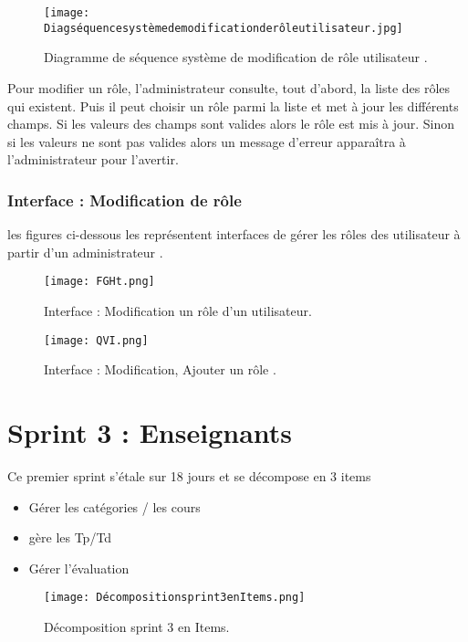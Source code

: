 \begin{figure}[ht]
	\centering
	\texttt{[image: Diagséquencesystèmedemodificationderôleutilisateur.jpg]}
	\caption{Diagramme de séquence système de modification de rôle utilisateur .}
	\label{fig:Diagramme de séquence système de modification de rôle utilisateur }
\end{figure}
\FloatBarrier

Pour modifier un rôle, l’administrateur consulte, tout d’abord, la liste des rôles qui
existent. Puis il peut choisir un rôle parmi la liste et met à jour les différents champs. Si
les valeurs des champs sont valides alors le rôle est mis à jour. Sinon si les valeurs ne sont
pas valides alors un message d’erreur apparaîtra à l’administrateur pour l’avertir.
\clearpage
\subsubsection{ Interface : Modification de rôle  }
les figures ci-dessous les représentent interfaces  de gérer les rôles des utilisateur à partir d'un administrateur .
\begin{figure}[ht]
	\centering
	\texttt{[image: FGHt.png]}
	\caption{Interface : Modification un rôle d'un utilisateur.}
	\label{fig:Modification de rôle1}
\end{figure}
\FloatBarrier
\begin{figure}[ht]
	\centering
	\texttt{[image: QVI.png]}
	\caption{Interface : Modification, Ajouter un rôle .}
	\label{fig:2 }
\end{figure}
\FloatBarrier


\clearpage
\section{Sprint 3 : Enseignants }
\label{sec:conception}

\begin{fquote}
	Ce premier sprint s’étale sur 18 jours et se décompose en 3 items
\end{fquote}
\smallskip
\begin{itemize}[label=$\diamond$]
	\item Gérer les catégories / les cours 
	
	\item  gère les Tp/Td
	\item  Gérer l'évaluation
	
\end{itemize}
\medskip
\medskip
\medskip
\medskip
\medskip
\medskip
\medskip
\medskip
\medskip
\medskip
\medskip
\begin{figure}[ht]
	\centering
	\texttt{[image: Décompositionsprint3enItems.png]}
	\caption{Décomposition sprint 3 en Items.}
	\label{fig:Décomposition srint 3 en Items}
\end{figure}
\FloatBarrier
\clearpage


